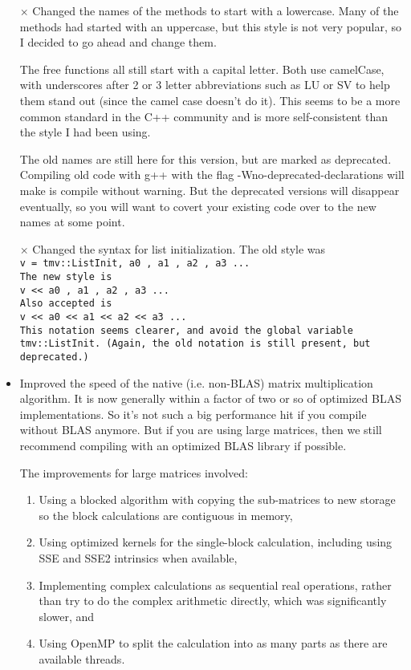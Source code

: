 \begin{description}
\begin{itemize}

\item[$\times$]
Changed the names of the methods to start with a lowercase.
Many of the methods had started with an uppercase, but this style
is not very popular, so I decided to go ahead and change them.

The free functions all still start with a capital letter.
Both use camelCase, with underscores after 2 or 3 letter abbreviations
such as LU or SV to help them stand out (since the camel case doesn't do it).
This seems to be a more common standard in the C++ community and is more
self-consistent than the style I had been using.

The old names are still here for this version, but are marked as deprecated.
Compiling old code with g++ with the flag -Wno-deprecated-declarations
will make is compile without warning.
But the deprecated versions will disappear eventually, so you will want to
covert your existing code over to the new names at some point.

\item[$\times$]
Changed the syntax for list initialization.
The old style was \\
\tt{v = tmv::ListInit, a0 , a1 , a2 , a3  ...}\\
The new style is \\
\tt{v << a0 , a1 , a2 , a3 ...}\\
Also accepted is \\
\tt{v << a0 << a1 << a2 << a3 ...}\\
This notation seems clearer, and avoid the global variable \tt{tmv::ListInit}.
(Again, the old notation is still present, but deprecated.)

\item
Improved the speed of the native (i.e. non-BLAS) matrix multiplication algorithm.
It is now generally within a factor of two or so of optimized BLAS implementations.
So it's not such a big performance hit if you compile without BLAS anymore.
But if you are using large matrices, then we still recommend compiling with 
an optimized BLAS library if possible.

The improvements for large matrices involved:
\begin{enumerate}
\item Using a blocked algorithm with copying the 
sub-matrices to new storage so the block calculations are contiguous in memory,
\item Using optimized kernels for the single-block calculation, including using
SSE and SSE2 intrinsics when available,
\item Implementing complex calculations
as sequential real operations, rather than try to do the complex arithmetic
directly, which was significantly slower, and
\item Using OpenMP to split the 
calculation into as many parts as there are available threads.
\end{enumerate}


\end{itemize}
\end{description}
